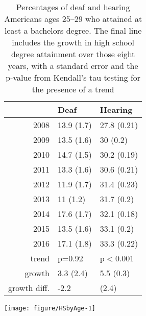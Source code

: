 \documentclass{article}\usepackage[]{graphicx}\usepackage[]{color}
\makeatletter
\def\maxwidth{ %
  \ifdim\Gin@nat@width>\linewidth
    \linewidth
  \else
    \Gin@nat@width
  \fi
}
\newenvironment{knitrout}{}{} %
\makeatother
\begin{document}
\begin{table}[ht]
\centering
\begin{tabular}{rll}
  \hline
 & Deaf & Hearing \\
  \hline
2008 & 13.9 (1.7) & 27.8 (0.21) \\
  2009 & 13.5 (1.6) & 30 (0.2) \\
  2010 & 14.7 (1.5) & 30.2 (0.19) \\
  2011 & 13.3 (1.6) & 30.6 (0.21) \\
  2012 & 11.9 (1.7) & 31.4 (0.23) \\
  2013 & 11 (1.2) & 31.7 (0.2) \\
  2014 & 17.6 (1.7) & 32.1 (0.18) \\
  2015 & 13.5 (1.6) & 33.1 (0.2) \\
  2016 & 17.1 (1.8) & 33.3 (0.22) \\
  trend & p=0.92 & p$<$0.001 \\
  growth & 3.3 (2.4) & 5.5 (0.3) \\
  growth diff. & -2.2 & (2.4) \\
   \hline
\end{tabular}
\caption{Percentages of deaf and hearing Americans ages 25--29 who attained at least a bachelors degree. The final line includes the growth in high school degree attainment over those eight years, with a standard error and the p-value from Kendall's tau testing for the presence of a trend}
\end{table}


\clearpage

\begin{center}
\begin{knitrout}
\color{fgcolor}
\texttt{[image: figure/HSbyAge-1]}

\end{knitrout}
\end{center}
\end{document}

